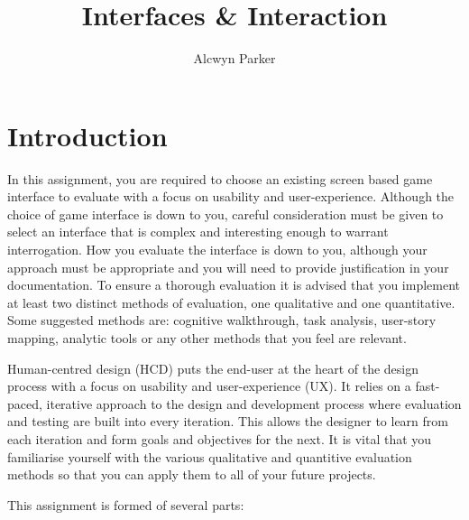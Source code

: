 \documentclass{../fal_assignment}
\title{Interfaces \& Interaction}
\author{Alcwyn Parker}
\begin{document}
\maketitle

\section*{Introduction}

In this assignment, you are required to choose an existing screen based game interface to evaluate with a focus on usability and user-experience. Although the choice of game interface is down to you, careful consideration must be given to select an interface that is complex and interesting enough to warrant interrogation. How you evaluate the interface is down to you, although your approach must be appropriate and you will need to provide justification in your documentation. To ensure a thorough evaluation it is advised that you implement at least two distinct methods of evaluation, one qualitative and one quantitative. Some suggested methods are: cognitive walkthrough, task analysis, user-story mapping, analytic tools or any other methods that you feel are relevant. 

Human-centred design (HCD) puts the end-user at the heart of the design process with a focus on usability and user-experience (UX). It relies on a fast-paced, iterative approach to the design and development process where evaluation and testing are built into every iteration. This allows the designer to learn from each iteration and form goals and objectives for the next. It is vital that you familiarise yourself with the various qualitative and quantitive evaluation methods so that you can apply them to all of your future projects.  

This assignment is formed of several parts:
\end{document}
